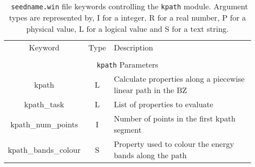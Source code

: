 \begin{table}[hH!]
\begin{center}
\begin{tabular}{|c|c|p{6cm}|}
  \hline
  Keyword & Type & Description \\
  &      &             \\
  \hline\hline
  \multicolumn{3}{|c|}{{\tt kpath} Parameters} \\
  \hline
  {\sc kpath}  & L & Calculate properties along a piecewise linear path in the BZ \\
  {\sc kpath\_task}& L & List of properties to evaluate\\
  {\sc kpath\_num\_points}& I & Number of points in the first kpath segment\\
  {\sc kpath\_bands\_colour}& S & Property used to colour the energy bands along the path\\
  \hline
\end{tabular}
\caption[Parameter file keywords controlling the kpath module.]  {{\tt
    seedname.win} file keywords controlling the {\tt kpath}
  module. Argument types are represented by, I for a integer, R for a
  real number, P for a physical value, L for a logical value and S for
  a text string.}
\label{parameter_keywords_kpath}
\end{center}
\end{table}

